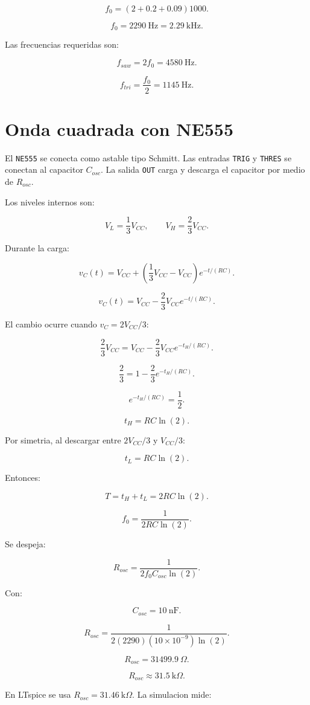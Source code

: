\documentclass[11pt,letterpaper]{article}
\begin{document}
\[
f_0=(2+0.2+0.09)1000.
\]

\[
\boxed{f_0=2290~\text{Hz}=2.29~\text{kHz}}.
\]

Las frecuencias requeridas son:

\[
f_{saw}=2f_0=4580~\text{Hz}.
\]

\[
f_{tri}=\frac{f_0}{2}=1145~\text{Hz}.
\]

\section{Onda cuadrada con NE555}

El \texttt{NE555} se conecta como astable tipo Schmitt. Las entradas
\texttt{TRIG} y \texttt{THRES} se conectan al capacitor \(C_{osc}\). La salida
\texttt{OUT} carga y descarga el capacitor por medio de \(R_{osc}\).

Los niveles internos son:

\[
V_L=\frac{1}{3}V_{CC},
\qquad
V_H=\frac{2}{3}V_{CC}.
\]

Durante la carga:

\[
v_C(t)=V_{CC}+
\left(
\frac{1}{3}V_{CC}-V_{CC}
\right)e^{-t/(RC)}.
\]

\[
v_C(t)=V_{CC}-\frac{2}{3}V_{CC}e^{-t/(RC)}.
\]

El cambio ocurre cuando \(v_C=2V_{CC}/3\):

\[
\frac{2}{3}V_{CC}
=
V_{CC}-\frac{2}{3}V_{CC}e^{-t_H/(RC)}.
\]

\[
\frac{2}{3}=1-\frac{2}{3}e^{-t_H/(RC)}.
\]

\[
e^{-t_H/(RC)}=\frac{1}{2}.
\]

\[
t_H=RC\ln(2).
\]

Por simetria, al descargar entre \(2V_{CC}/3\) y \(V_{CC}/3\):

\[
t_L=RC\ln(2).
\]

Entonces:

\[
T=t_H+t_L=2RC\ln(2).
\]

\[
f_0=\frac{1}{2RC\ln(2)}.
\]

Se despeja:

\[
R_{osc}=\frac{1}{2f_0C_{osc}\ln(2)}.
\]

Con:

\[
C_{osc}=10~\text{nF}.
\]

\[
R_{osc}=
\frac{1}
{2(2290)(10\times10^{-9})\ln(2)}.
\]

\[
R_{osc}=31499.9~\Omega.
\]

\[
\boxed{R_{osc}\approx31.5~\text{k}\Omega}.
\]

En LTspice se usa \(R_{osc}=31.46~\text{k}\Omega\). La simulacion mide:
\end{document}
